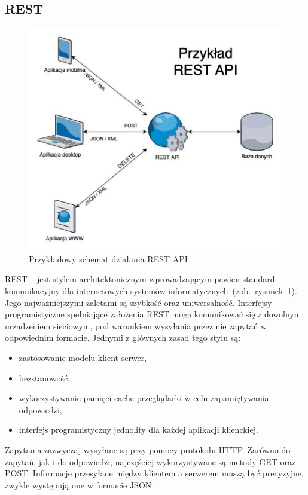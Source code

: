 \subsection{REST}
\begin{figure}[H]
	\centering\includegraphics[width=12cm]{figures/rest}
	\caption{Przykładowy schemat działania REST API~\cite{SchematRest}}\label{rys:rest}
\end{figure}
REST ~\cite{REST} jest stylem architektonicznym wprowadzającym pewien standard komunikacyjny dla internetowych systemów informatycznych~(zob.~rysunek~\ref{rys:rest}). Jego najważniejszymi zaletami są szybkość oraz uniwersalność. Interfejsy programistyczne spełniające założenia REST mogą komunikować się z dowolnym urządzeniem sieciowym, pod warunkiem wysyłania przez nie zapytań w odpowiednim formacie. Jednymi z głównych zasad tego stylu są:
\begin{itemize}
	\item zastosowanie modelu klient-serwer,
	\item bezstanowość,
	\item wykorzystywanie pamięci cache przeglądarki w celu zapamiętywania odpowiedzi,
	\item interfejs programistyczny jednolity dla każdej aplikacji klienckiej.
\end{itemize}
Zapytania zazwyczaj wysyłane są przy pomocy protokołu HTTP. Zarówno do zapytań, jak i do odpowiedzi, najczęściej wykorzystywane są metody GET oraz POST. Informacje przesyłane między klientem a serwerem muszą być precyzyjne, zwykle występują one w formacie JSON. 

